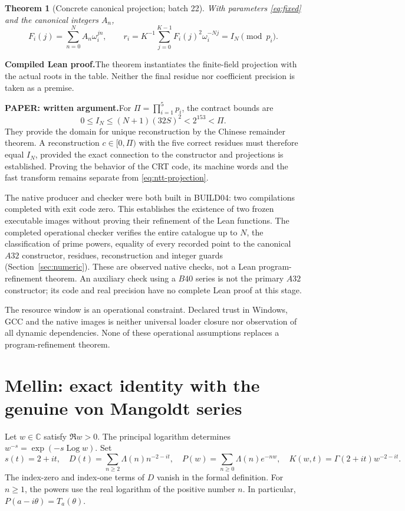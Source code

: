 \documentclass[11pt,a4paper]{article}
\newtheorem{theorem}{Theorem}[section]
\theoremstyle{remark}
\newcommand{\Lam}{\Lambda}
\newcommand{\C}{\mathbb C}
\newcommand{\paid}{\textbf{Compiled Lean proof.}\space}
\newcommand{\paper}{\textbf{PAPER: written argument.}\space}
\DeclareMathOperator{\Log}{Log}
\begin{document}
\begin{theorem}[Concrete canonical projection; batch 22]
With parameters \eqref{eq:fixed} and the canonical integers $A_n$,
\begin{equation}\label{eq:ntt-projection}
F_i(j)=\sum_{n=0}^{N}A_n\omega_i^{jn},\qquad
r_i=K^{-1}\sum_{j=0}^{K-1}F_i(j)^2\omega_i^{-Nj}
=I_N\pmod {p_i}.
\end{equation}
\end{theorem}
\paid The theorem instantiates the finite-field projection with the
actual roots in the table. Neither the final residue nor coefficient
precision is taken as a premise.

\paper For $\Pi=\prod_{i=1}^5p_i$, the contract bounds are
\begin{equation}\label{eq:crt-size}
0\le I_N\le(N+1)(32S)^2<2^{153}<\Pi.
\end{equation}
They provide the domain for unique reconstruction by the Chinese remainder
theorem. A reconstruction $c\in[0,\Pi)$ with the five correct residues must
therefore equal $I_N$, provided the exact connection to the constructor and
projections is established. Proving the behavior of the CRT code, its machine
words and the fast transform remains separate from \eqref{eq:ntt-projection}.

The native producer and checker were both built in BUILD04: two compilations
completed with exit code zero. This establishes the existence of two frozen
executable images without proving their refinement of the Lean functions.
The completed operational checker verifies the entire catalogue up to $N$,
the classification of prime powers, equality of every recorded point to the
canonical $A32$ constructor, residues, reconstruction and integer guards
(Section~\ref{sec:numeric}). These are observed native checks, not a Lean
program-refinement theorem.
An auxiliary check using a $B40$ series is not the primary $A32$ constructor;
its code and real precision have no complete Lean proof at this stage.

The resource window is an operational constraint. Declared trust in Windows,
GCC and the native images is neither universal loader closure nor observation
of all dynamic dependencies. None of these operational assumptions replaces
a program-refinement theorem.

\clearpage
\section{Mellin: exact identity with the genuine von Mangoldt series}\label{sec:mellin}
Let $w\in\C$ satisfy $\Re w>0$. The principal logarithm determines
$w^{-s}=\exp(-s\Log w)$. Set
\begin{equation}\label{eq:mellin-objects}
s(t)=2+it,\quad
D(t)=\sum_{n\ge2}\Lam(n)n^{-2-it},\quad
P(w)=\sum_{n\ge0}\Lam(n)e^{-nw},\quad
K(w,t)=\Gamma(2+it)w^{-2-it}.
\end{equation}
The index-zero and index-one terms of $D$ vanish in the formal definition.
For $n\ge1$, the powers use the real logarithm of the positive number $n$.
In particular, $P(a-i\theta)=T_a(\theta)$.
\end{document}
